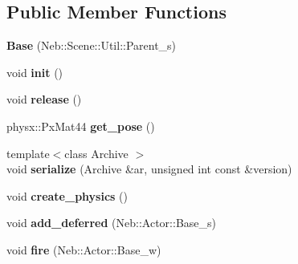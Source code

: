 \subsection*{\-Public \-Member \-Functions}
\begin{DoxyCompactItemize}
\item 
\hypertarget{classNeb_1_1Scene_1_1Base_a431a7379cd469ed7d1a98d3f78a9aa83}{{\bfseries \-Base} (\-Neb\-::\-Scene\-::\-Util\-::\-Parent\-\_\-s)}\label{classNeb_1_1Scene_1_1Base_a431a7379cd469ed7d1a98d3f78a9aa83}

\item 
\hypertarget{classNeb_1_1Scene_1_1Base_a73da912ea156f9a10578537062cbcbaf}{void {\bfseries init} ()}\label{classNeb_1_1Scene_1_1Base_a73da912ea156f9a10578537062cbcbaf}

\item 
\hypertarget{classNeb_1_1Scene_1_1Base_abd3b47ebbbfa21ad01fa0414ad801ebe}{void {\bfseries release} ()}\label{classNeb_1_1Scene_1_1Base_abd3b47ebbbfa21ad01fa0414ad801ebe}

\item 
\hypertarget{classNeb_1_1Scene_1_1Base_ab1a1720a07c71246df641ac388219aab}{physx\-::\-Px\-Mat44 {\bfseries get\-\_\-pose} ()}\label{classNeb_1_1Scene_1_1Base_ab1a1720a07c71246df641ac388219aab}

\item 
\hypertarget{classNeb_1_1Scene_1_1Base_af98c5a6ef603a147b4de4f6ec148ec3f}{{\footnotesize template$<$class Archive $>$ }\\void {\bfseries serialize} (\-Archive \&ar, unsigned int const \&version)}\label{classNeb_1_1Scene_1_1Base_af98c5a6ef603a147b4de4f6ec148ec3f}

\item 
\hypertarget{classNeb_1_1Scene_1_1Base_a876e6ed9b1f7d461f413b3530bf5c3fe}{void {\bfseries create\-\_\-physics} ()}\label{classNeb_1_1Scene_1_1Base_a876e6ed9b1f7d461f413b3530bf5c3fe}

\item 
\hypertarget{classNeb_1_1Scene_1_1Base_ac7ddb94cd7933f96bbd1d720e1619994}{void {\bfseries add\-\_\-deferred} (\-Neb\-::\-Actor\-::\-Base\-\_\-s)}\label{classNeb_1_1Scene_1_1Base_ac7ddb94cd7933f96bbd1d720e1619994}

\item 
\hypertarget{classNeb_1_1Scene_1_1Base_aa44ae1c399f8e3c38c39d76fcd687b76}{void {\bfseries fire} (\-Neb\-::\-Actor\-::\-Base\-\_\-w)}\label{classNeb_1_1Scene_1_1Base_aa44ae1c399f8e3c38c39d76fcd687b76}


\end{DoxyCompactItemize}
